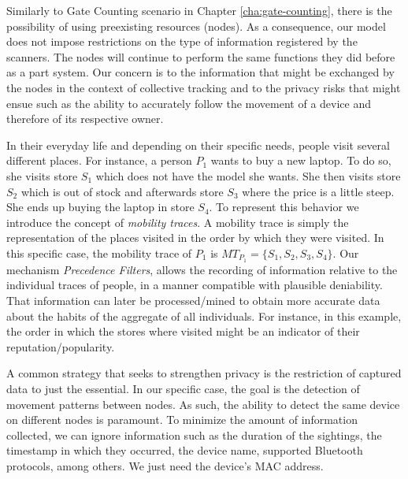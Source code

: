 Similarly to Gate Counting scenario in Chapter
\ref{cha:gate-counting}, there is the possibility of using preexisting
resources (nodes). As a consequence, our model does not impose
restrictions on the type of information registered by the
scanners. The nodes will continue to perform the same functions they
did before as a part system. Our concern is to the information that
might be exchanged by the nodes in the context of collective tracking
and to the privacy risks that might ensue such as the ability
to accurately follow the movement of a device and therefore of its
respective owner.

In their everyday life and depending on their specific needs, people
visit several different places. For instance, a person $P_1$ wants to
buy a new laptop. To do so, she visits store $S_1$ which does not have
the model she wants. She then visits store $S_2$ which is out of
stock and afterwards store $S_3$ where the price is a little
steep. She ends up buying the laptop in store $S_4$. To represent this
behavior we introduce the concept of \emph{mobility traces}. A
mobility trace is simply the representation of the places visited in the
order by which they were visited. In this specific case, the mobility
trace of $P_1$ is $MT_{P_1}=\{S_1,S_2,S_3,S_4\}$. Our mechanism
\emph{Precedence Filters}, allows the recording of information
relative to the individual traces of people, in a manner compatible
with plausible deniability. That information can later be
processed/mined to obtain more accurate data about the habits of the
aggregate of all individuals. For instance, in this example, the order
in which the stores where visited might be an indicator of their
reputation/popularity.

A common strategy that seeks to strengthen privacy is the restriction
of captured data to just the essential. In our specific case, the goal
is the detection of movement patterns between nodes. As such, the
ability to detect the same device on different nodes is paramount. To
minimize the amount of information collected, we can ignore
information such as the duration of the sightings, the timestamp in which
they occurred, the device name, supported Bluetooth protocols,
among others. We just need the device's MAC address.

